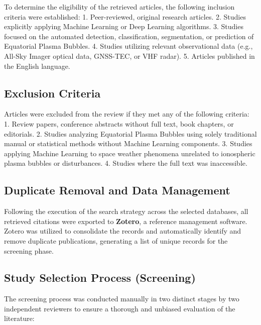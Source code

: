 To determine the eligibility of the retrieved articles, the following inclusion criteria were established: 1. Peer-reviewed, original research articles. 2. Studies explicitly applying Machine Learning or Deep Learning algorithms. 3. Studies focused on the automated detection, classification, segmentation, or prediction of Equatorial Plasma Bubbles. 4. Studies utilizing relevant observational data (e.g., All-Sky Imager optical data, GNSS-TEC, or VHF radar). 5. Articles published in the English language.

\subsection{Exclusion Criteria}\label{subsec:exclusion-criteria}

Articles were excluded from the review if they met any of the following criteria: 1. Review papers, conference abstracts without full text, book chapters, or editorials. 2. Studies analyzing Equatorial Plasma Bubbles using solely traditional manual or statistical methods without Machine Learning components. 3. Studies applying Machine Learning to space weather phenomena unrelated to ionospheric plasma bubbles or disturbances. 4. Studies where the full text was inaccessible.

\subsection{Duplicate Removal and Data Management}\label{subsec:duplicate-removal-and-data-management}

Following the execution of the search strategy across the selected databases, all retrieved citations were exported to \textbf{Zotero}, a reference management software. Zotero was utilized to consolidate the records and automatically identify and remove duplicate publications, generating a list of unique records for the screening phase.

\subsection{Study Selection Process (Screening)}\label{subsec:study-selection-process-screening}

The screening process was conducted manually in two distinct stages by two independent reviewers to ensure a thorough and unbiased evaluation of the literature:

